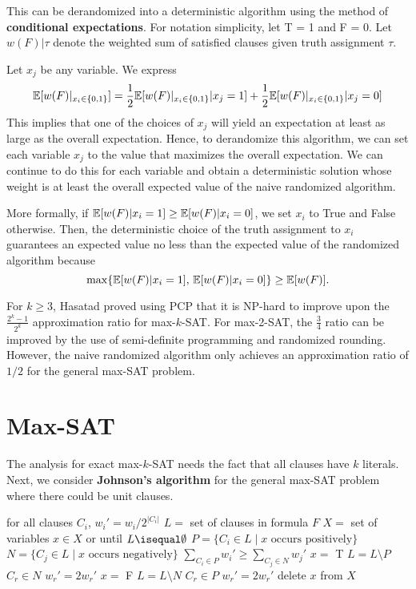 This can be derandomized into a deterministic algorithm using the method of \textbf{conditional expectations}. For notation simplicity, let T = 1 and F = 0. Let $w(F)|\tau$ denote the weighted sum of satisfied clauses given truth assignment $\tau$.

Let $x_j$ be any variable. We express
$$
\mathbb{E}[w(F)|_{x_i \in \{0,1\}}] = \frac{1}{2} \mathbb{E}[w(F)|_{x_i \in \{0,1\}}|x_j = 1] + \frac{1}{2} \mathbb{E}[w(F) |_{x_i \in \{0,1\}} | x_j = 0]
$$
This implies that one of the choices of $x_j$ will yield an expectation at least as large as the overall expectation. Hence, to derandomize this algorithm, we can set each variable $x_j$ to the value that maximizes the overall expectation. We can continue to do this for each variable and obtain a deterministic solution whose weight is at least the overall expected value of the naive randomized algorithm.

More formally, if $\mathbb{E}[w(F) | x_i = 1] \geq \mathbb{E}[w(F) | x_i = 0 ]$, we set $x_i$ to True and False otherwise. Then, the deterministic choice of the truth assignment to $x_i$ guarantees an expected value no less than the expected value of the randomized algorithm because
$$
\max\{\mathbb{E}[w(F) | x_i = 1], \, \mathbb{E}[w(F) | x_i = 0]\} \geq \mathbb{E}[w(F)].
$$

For $k \geq 3$, Hasatad proved using PCP that it is NP-hard to improve upon the $\frac{2^k - 1}{2^k}$ approximation ratio for max-$k$-SAT. For max-2-SAT, the $\frac{3}{4}$ ratio can be improved by the use of semi-definite programming and randomized rounding. However, the naive randomized algorithm only achieves an approximation ratio of $1/2$ for the general max-SAT problem.

\section{Max-SAT}

The analysis for exact max-$k$-SAT needs the fact that all clauses have $k$ literals. Next, we consider \textbf{Johnson's algorithm} for the general max-SAT problem where there could be unit clauses.

\begin{codebox}
    \li for all clauses $C_i$, $w_i' = w_i / 2^{|C_i|}$
    \li $L = $ set of clauses in formula $F$
    \li $X = $ set of variables
    \li \For $x \in X$ or until $L \isequal \emptyset$ \Do
        \li $P = \{C_i \in L \mid \text{$x$ occurs positively}\}$
        \li $N = \{C_j \in L \mid \text{$x$ occurs negatively}\}$
        \li \If $\sum_{C_i \in P} w_i' \geq \sum_{C_j \in N} w_j'$ \Then
            \li $x = $ T
            \li $L = L \setminus P$
            \li \For $C_r \in N$ \Do
                \li $w_r' = 2w_r'$
            \End
        \li \Else
            \li $x = $ F
            \li $L = L \setminus N$
            \li \For $C_r \in P$ \Do
                \li $w_r' = 2w_r'$
            \End
        \End
    \li delete $x$ from $X$
    \End   
\end{codebox}

